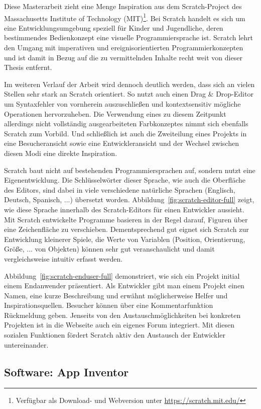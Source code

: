 Diese Masterarbeit zieht eine Menge Inspiration aus dem Scratch-Project des Massachusetts Institute of Technology (MIT)\footnote{Verfügbar als Download- und Webversion unter \url{https://scratch.mit.edu/}}. Bei Scratch handelt es sich um eine Entwicklungsumgebung speziell für Kinder und Jugendliche, deren bestimmendes Bedienkonzept eine visuelle Programmiersprache ist. Scratch lehrt den Umgang mit imperativen und ereignisorientierten Programmierkonzepten und ist damit in Bezug auf die zu vermittelnden Inhalte recht weit von dieser Thesis entfernt.

Im weiteren Verlauf der Arbeit wird dennoch deutlich werden, dass sich \idename{} an vielen Stellen sehr stark an Scratch orientiert. So nutzt auch \idename{} einen Drag \& Drop-Editor um Syntaxfehler von vornherein auszuschließen und kontextsensitiv mögliche Operationen hervorzuheben. Die Verwendung eines zu diesem Zeitpunkt allerdings nicht vollständig ausgearbeiteten Farbkonzeptes nimmt sich ebenfalls Scratch zum Vorbild. Und schließlich ist auch die Zweiteilung eines Projekts in eine Besucheransicht sowie eine Entwickleransicht und der Wechsel zwischen diesen Modi eine direkte Inspiration.

Scratch baut nicht auf bestehenden Programmiersprachen auf, sondern nutzt eine Eigenentwicklung. Die Schlüsselwörter dieser Sprache, wie auch die Oberfläche des Editors, sind dabei in viele verschiedene natürliche Sprachen (Englisch, Deutsch, Spanisch, ...) übersetzt worden. Abbildung~\ref{fig:scratch-editor-full} zeigt, wie diese Sprache innerhalb des Scratch-Editors für einen Entwickler aussieht. Mit Scratch entwickelte Programme basieren in der Regel darauf, Figuren über eine Zeichenfläche zu verschieben. Dementsprechend gut eignet sich Scratch zur Entwicklung kleinerer Spiele, die Werte von Variablen (Position, Orientierung, Größe, ... von Objekten) können sehr gut veranschaulicht und damit vergleichsweise intuitiv erfasst werden.

Abbildung~\ref{fig:scratch-enduser-full} demonstriert, wie sich ein Projekt initial einem Endanwender präsentiert. Als Entwickler gibt man einem Projekt einen Namen, eine kurze Beschreibung und erwähnt möglicherweise Helfer und Inspirationsquellen. Besucher können über eine Kommentarfunktion Rückmeldung geben. Jenseits von den Austauschmöglichkeiten bei konkreten Projekten ist in die Webseite auch ein eigenes Forum integriert. Mit diesen sozialen Funktionen fördert Scratch aktiv den Austausch der Entwickler untereinander.

\subsection{Software: App Inventor}

